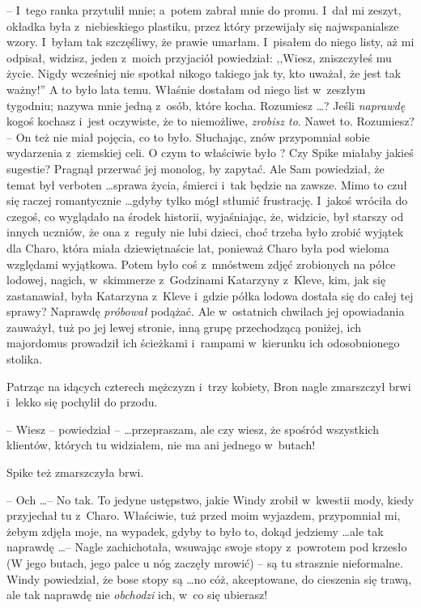 \documentclass[oneside,polish,11pt,rmheadings]{mwbk}
\begin{document}
-- I~tego ranka przytulił mnie; a~potem zabrał mnie do promu. I~dał mi zeszyt, okładka była z~niebieskiego plastiku, przez który przewijały się najwspanialsze wzory. I~byłam tak szczęśliwy, że prawie umarłam. I~pisałem do niego listy, aż mi odpisał, widzisz, jeden z~moich przyjaciół powiedział: ,,Wiesz, zniszczyłeś mu życie. Nigdy wcześniej nie spotkał nikogo takiego jak ty, kto uważał, że jest tak ważny!'' A to było lata temu. Właśnie dostałam od niego list w~zeszłym tygodniu; nazywa mnie jedną z~osób, które kocha. Rozumiesz \ldots  ? Jeśli \textit{naprawdę }kogoś kochasz i~jest oczywiste, że to niemożliwe, \textit{zrobisz to}. Nawet to. Rozumiesz? -- On też nie miał pojęcia, co to było. Słuchając, znów przypomniał sobie wydarzenia z~ziemskiej celi. O czym to właściwie było ? Czy Spike miałaby jakieś sugestie? Pragnął przerwać jej monolog, by zapytać. Ale Sam powiedział, że temat był verboten \ldots  sprawa życia, śmierci i~tak będzie na zawsze. Mimo to czuł się raczej romantycznie \ldots  gdyby tylko mógł stłumić frustrację. I~jakoś wróciła do czegoś, co wyglądało na środek historii, wyjaśniając, że, widzicie, był starszy od innych uczniów, że ona z~reguły nie lubi dzieci, choć trzeba było zrobić wyjątek dla Charo, która miała dziewiętnaście lat, ponieważ Charo była pod wieloma względami wyjątkowa. Potem było coś z~mnóstwem zdjęć zrobionych na półce lodowej, nagich, w~skimmerze z~Godzinami Katarzyny z~Kleve, kim, jak się zastanawiał, była Katarzyna z~Kleve i~gdzie półka lodowa dostała się do całej tej sprawy? Naprawdę \textit{próbował }podążać. Ale w~ostatnich chwilach jej opowiadania zauważył, tuż po jej lewej stronie, inną grupę przechodzącą poniżej, ich majordomus prowadził ich ścieżkami i~rampami w~kierunku ich odosobnionego stolika. 

Patrząc na idących czterech mężczyzn i~trzy kobiety, Bron nagle zmarszczył brwi i~lekko się pochylił do przodu. 

-- Wiesz -- powiedział --  \ldots  przepraszam, ale czy wiesz, że spośród wszystkich klientów, których tu widziałem, nie ma ani jednego w~butach! 

Spike też zmarszczyła brwi. 

-- Och \ldots  -- No tak. To jedyne ustępstwo, jakie Windy zrobił w~kwestii mody, kiedy przyjechał tu z~Charo. Właściwie, tuż przed moim wyjazdem, przypomniał mi, żebym zdjęła moje, na wypadek, gdyby to było to, dokąd jedziemy  \ldots  ale tak naprawdę \ldots  -- Nagle zachichotała, wsuwając swoje stopy z~powrotem pod krzesło (W jego butach, jego palce u nóg zaczęły mrowić) -- są tu strasznie nieformalne. Windy powiedział, że bose stopy są \ldots  no cóż, akceptowane, do cieszenia się trawą, ale tak naprawdę nie \textit{obchodzi }ich, w~co się ubierasz! 
\end{document}
